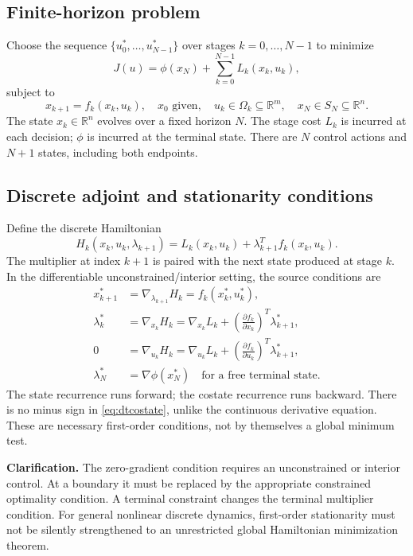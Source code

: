 \documentclass[11pt,a4paper]{article}
\numberwithin{equation}{section}
\numberwithin{figure}{section}
\numberwithin{table}{section}
\newcommand{\clarify}[1]{\par\textbf{Clarification.} #1\par}
\newcommand{\R}{\mathbb{R}}
\begin{document}
\subsection{Finite-horizon problem}
Choose the sequence $\{u_0^*,\ldots,u_{N-1}^*\}$ over stages $k=0,\ldots,N-1$ to minimize
\begin{equation}\label{eq:dtcost}J(u)=\phi(x_N)+\sum_{k=0}^{N-1}L_k(x_k,u_k),\end{equation}
subject to
\[x_{k+1}=f_k(x_k,u_k),\quad x_0\text{ given},\quad u_k\in\Omega_k\subseteq\R^m,\quad x_N\in S_N\subseteq\R^n.\]
The state $x_k\in\R^n$ evolves over a fixed horizon $N$. The stage cost $L_k$ is incurred at each decision; $\phi$ is incurred at the terminal state. There are $N$ control actions and $N+1$ states, including both endpoints.

\subsection{Discrete adjoint and stationarity conditions}
Define the discrete Hamiltonian
\begin{equation}\label{eq:dtham}H_k(x_k,u_k,\lambda_{k+1})=L_k(x_k,u_k)+\lambda_{k+1}^Tf_k(x_k,u_k).\end{equation}
The multiplier at index $k+1$ is paired with the next state produced at stage $k$. In the differentiable unconstrained/interior setting, the source conditions are
\begin{align}
x_{k+1}^*&=\nabla_{\lambda_{k+1}}H_k=f_k(x_k^*,u_k^*),\\
\lambda_k^*&=\nabla_{x_k}H_k
=\nabla_{x_k}L_k+\left(\frac{\partial f_k}{\partial x_k}\right)^T\lambda_{k+1}^*,\label{eq:dtcostate}\\
0&=\nabla_{u_k}H_k
=\nabla_{u_k}L_k+\left(\frac{\partial f_k}{\partial u_k}\right)^T\lambda_{k+1}^*,\label{eq:dtstationary}\\
\lambda_N^*&=\nabla\phi(x_N^*)\quad\text{for a free terminal state}.
\end{align}
The state recurrence runs forward; the costate recurrence runs backward. There is no minus sign in \cref{eq:dtcostate}, unlike the continuous derivative equation. These are necessary first-order conditions, not by themselves a global minimum test.

\clarify{The zero-gradient condition requires an unconstrained or interior control. At a boundary it must be replaced by the appropriate constrained optimality condition. A terminal constraint changes the terminal multiplier condition. For general nonlinear discrete dynamics, first-order stationarity must not be silently strengthened to an unrestricted global Hamiltonian minimization theorem.}
\end{document}
